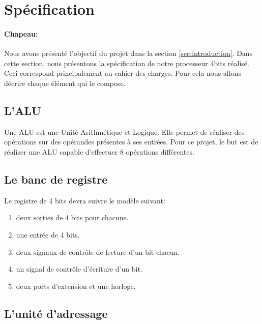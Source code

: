 \section{Spécification}
\label{sec:specification}

\paragraph{Chapeau:}Nous avons présenté l'objectif du projet dans la section \ref{sec:introduction}. Dans cette section, nous présentons la spécification de notre processeur 4bits réalisé. Ceci correspond principalement au cahier des charges. Pour cela nous allons décrire chaque élément qui le compose.

\subsection{L'ALU}
\label{sec:ALU}
Une ALU est une Unité Arithmétique et Logique. Elle permet de réaliser des opérations sur des
opérandes présentes à ses entrées. Pour ce projet, le but est de réaliser une ALU capable d'effectuer 8
opérations différentes.


\subsection{Le banc de registre}
\label{sec:banc}
Le registre de 4 bits devra suivre le modèle suivant:

\begin{enumerate}
\item deux sorties de 4 bits pour chacune.
\item une entrée de 4 bits.
\item deux signaux de contrôle de lecture d'un bit chacun.
\item un signal de contrôle d'écriture d'un bit.
\item deux ports d’extension et une horloge.
\end{enumerate}


\clearpage
\subsection{L'unité d'adressage}
\label{sec:unité adressage}

